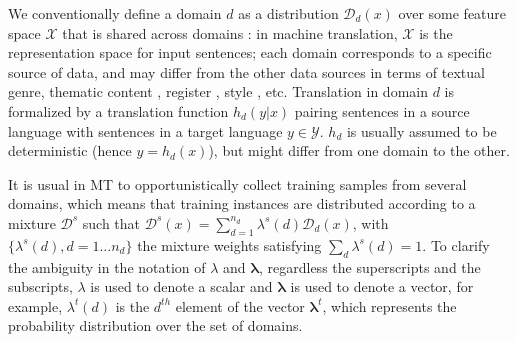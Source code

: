 \documentclass[11pt]{article}
\newcommand{\vlambda}{\ensuremath{\boldsymbol\lambda}\xspace} %
\begin{document}
We conventionally define a domain $d$ as a distribution $\mathcal{D}_d(x)$ over some feature space $\mathcal{X}$ that is shared across domains \citep{Pan10asurvey}: in machine translation, $\mathcal{X}$ is the representation space for input sentences; each domain corresponds to a specific source of data, and may differ from the other data sources in terms of textual genre, thematic content \citep{Chen16guided,Zhang16topicinformed}, register \citep{Sennrich16politeness}, style \citep{Niu18multitask}, etc. Translation in domain $d$ is formalized by a translation function $h_d(y|x)$ pairing sentences in a source language with sentences in a target language $y \in \mathcal{Y}$. $h_d$ is usually assumed to be deterministic (hence $y = h_d(x)$), but might differ from one domain to the other.

It is usual in MT to opportunistically collect training samples from several domains, which means that training instances are distributed according to a mixture $\mathcal{D}^s$ such that $\mathcal{D}^s(x) = \sum_{d=1}^{n_d} \lambda^{s}(d) \mathcal{D}_d(x)$, with $\{\lambda^{s}(d), d=1 \dots n_d\}$ the mixture weights satisfying $\sum_d \lambda^{s}(d)=1$. To clarify the ambiguity in the notation of $\lambda$ and $\vlambda$, regardless the superscripts and the subscripts, $\lambda$ is used to denote a scalar and $\vlambda$ is used to denote a vector, for example, $\lambda^{t}(d)$ is the $d^{th}$ element of the vector $\vlambda^{t}$, which represents the probability distribution over the set of domains.
\end{document}
